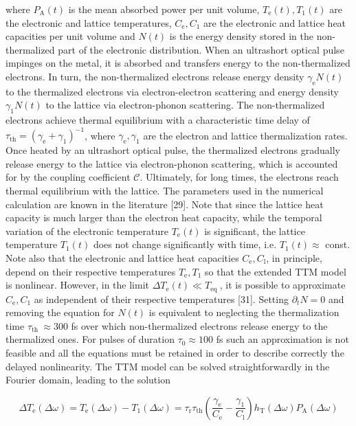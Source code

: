 \documentclass[10pt]{article}
\begin{document}
where $P_{\mathrm{A}}(t)$ is the mean absorbed power per unit volume, $T_{\mathrm{e}}(t), T_{1}(t)$ are the electronic and lattice temperatures, $C_{\mathrm{e}}, C_{1}$ are the electronic and lattice heat capacities per unit volume and $N(t)$ is the energy density stored in the non-thermalized part of the electronic distribution. When an ultrashort optical pulse impinges on the metal, it is absorbed and transfers energy to the non-thermalized electrons. In turn, the non-thermalized electrons release energy density $\gamma_{\mathrm{e}} N(t)$ to the thermalized electrons via electron-electron scattering and energy density $\gamma_{1} N(t)$ to the lattice via electron-phonon scattering. The non-thermalized electrons achieve thermal equilibrium with a characteristic time delay of $\tau_{\mathrm{th}}=\left(\gamma_{\mathrm{e}}+\gamma_{1}\right)^{-1}$, where $\gamma_{\mathrm{e}}, \gamma_{1}$ are the electron and lattice thermalization rates. Once heated by an ultrashort optical pulse, the thermalized electrons gradually release energy to the lattice via electron-phonon scattering, which is accounted for by the coupling coefficient $\mathcal{C}$. Ultimately, for long times, the electrons reach thermal equilibrium with the lattice. The parameters used in the numerical calculation are known in the literature [29]. Note that since the lattice heat capacity is much larger than the electron heat capacity, while the temporal variation of the electronic temperature $T_{\mathrm{e}}(t)$ is significant, the lattice temperature $T_{1}(t)$ does not change significantly with time, i.e. $T_{1}(t) \approx$ const. Note also that the electronic and lattice heat capacities $C_{\mathrm{e}}, C_{\mathrm{l}}$, in principle, depend on their respective temperatures $T_{\mathrm{e}}, T_{1}$ so that the extended TTM model is nonlinear. However, in the limit $\Delta T_{\mathrm{e}}(t) \ll T_{\text {eq }}$, it is possible to approximate $C_{\mathrm{e}}, C_{1}$ as independent of their respective temperatures [31]. Setting $\partial_{t} N=0$ and removing the equation for $N(t)$ is equivalent to neglecting the thermalization time $\tau_{\text {th }} \approx 300$ fs over which non-thermalized electrons release energy to the thermalized ones. For pulses of duration $\tau_{0} \approx 100$ fs such an approximation is not feasible and all the equations must be retained in order to describe correctly the delayed nonlinearity. The TTM model can be solved straightforwardly in the Fourier domain, leading to the solution


\begin{equation*}
\Delta T_{\mathrm{e}}(\Delta \omega)=T_{\mathrm{e}}(\Delta \omega)-T_{1}(\Delta \omega)=\tau_{\mathrm{r}} \tau_{\mathrm{th}}\left(\frac{\gamma_{\mathrm{e}}}{C_{\mathrm{e}}}-\frac{\gamma_{1}}{C_{\mathrm{l}}}\right) h_{\mathrm{T}}(\Delta \omega) P_{\mathrm{A}}(\Delta \omega) \tag{8}
\end{equation*}
\end{document}
